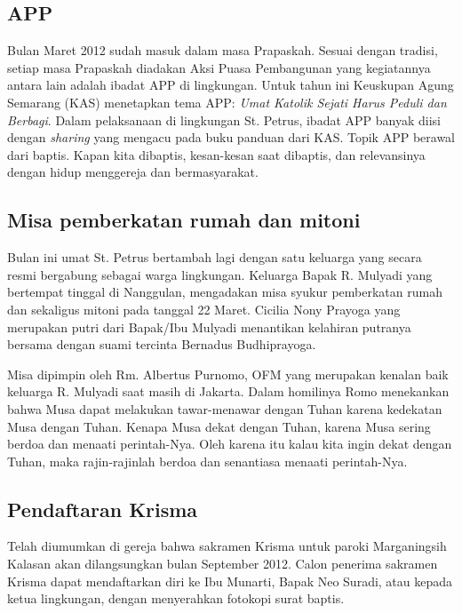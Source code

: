 
\subsection*{APP}
Bulan Maret 2012 sudah masuk dalam masa Prapaskah. Sesuai dengan tradisi, setiap masa Prapaskah diadakan Aksi Puasa Pembangunan yang kegiatannya antara lain adalah ibadat APP di lingkungan. Untuk tahun ini Keuskupan Agung Semarang (KAS) menetapkan tema APP: \textit{Umat Katolik Sejati Harus Peduli dan Berbagi}. Dalam pelaksanaan di lingkungan St. Petrus, ibadat APP banyak diisi dengan \textit{sharing} yang mengacu pada buku panduan dari KAS.
Topik APP berawal dari baptis. Kapan kita dibaptis, kesan-kesan saat dibaptis, dan relevansinya dengan hidup menggereja dan bermasyarakat.

\subsection*{Misa pemberkatan rumah dan mitoni}
Bulan ini umat St. Petrus bertambah lagi dengan satu keluarga yang secara resmi bergabung sebagai warga lingkungan. Keluarga Bapak R. Mulyadi yang bertempat tinggal di Nanggulan, mengadakan misa syukur pemberkatan rumah dan sekaligus mitoni pada tanggal 22 Maret. Cicilia Nony Prayoga yang merupakan putri dari Bapak/Ibu Mulyadi menantikan kelahiran putranya bersama dengan suami tercinta
Bernadus Budhiprayoga.

Misa dipimpin oleh Rm. Albertus Purnomo, OFM yang merupakan kenalan baik keluarga R. Mulyadi saat masih di Jakarta. Dalam homilinya Romo menekankan bahwa Musa dapat melakukan tawar-menawar dengan Tuhan karena kedekatan Musa dengan Tuhan. Kenapa Musa dekat dengan Tuhan, karena Musa sering berdoa dan menaati perintah-Nya. Oleh karena itu kalau kita ingin dekat dengan Tuhan, maka rajin-rajinlah berdoa dan senantiasa menaati perintah-Nya.

\subsection*{Pendaftaran Krisma}
Telah diumumkan di gereja bahwa sakramen Krisma untuk paroki Marganingsih Kalasan akan dilangsungkan bulan September 2012. Calon penerima sakramen Krisma dapat mendaftarkan diri ke Ibu Munarti, Bapak Neo Suradi, atau kepada ketua lingkungan, dengan menyerahkan fotokopi surat baptis.
